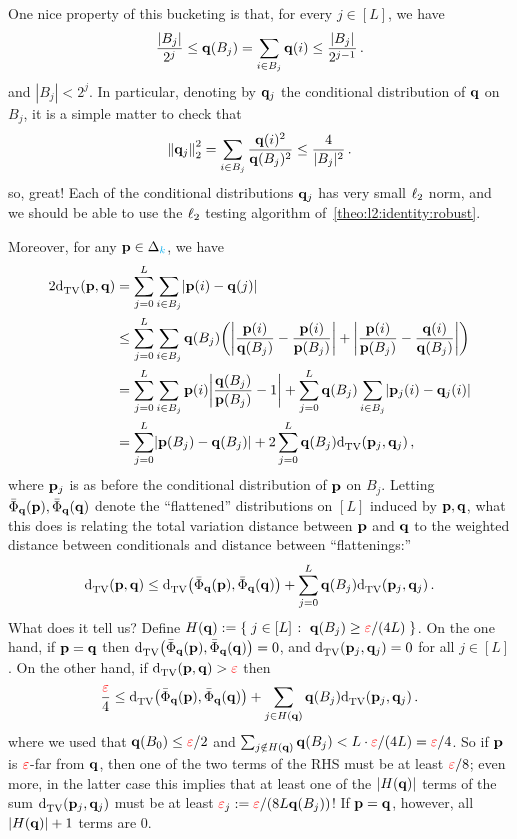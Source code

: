  One nice property of this bucketing is that, for every $j\in[L]$, we have
 \begin{equation}
 \label{eq:bucketing:bucketsize}
 	\frac{|B_j|}{2^{j}}  \leq \q(B_j) = \sum_{i\in B_j} \q(i) \leq \frac{|B_j|}{2^{j-1}}\,.
 \end{equation}
 and $|B_j| < 2^j$.
 In particular, denoting by $\q_j$ the conditional distribution of $\q$ on $B_j$, it is a simple matter to check that
\begin{equation}
 \label{eq:bucketing:l2norm}
 		\normtwo{\q_j}^2 = \sum_{i\in B_j} \frac{\q(i)^2}{\q(B_j)^2} \leq \frac{4}{|B_j|^2}\,.
\end{equation}
 so, great! Each of the conditional distributions $\q_j$ has very small $\lp[2]$ norm, and we should be able to use the $\lp[2]$ testing algorithm of~\cref{theo:l2:identity:robust}.
 
Moreover, for any $\p\in\distribs{\ab}$, we have
 \begin{align*}
 	2\totalvardist{\p}{\q} 
 	&= \sum_{j=0}^{L} \sum_{i\in B_j} \abs{\p(i)-\q(j)} \\
 	&\leq \sum_{j=0}^{L} \sum_{i\in B_j} \q(B_j)\Paren{ \abs{\frac{\p(i)}{\q(B_j)} - \frac{\p(i)}{\p(B_j)}}+\abs{\frac{\p(i)}{\p(B_j)} - \frac{\q(i)}{\q(B_j)}} }\\
 	&= \sum_{j=0}^{L} \sum_{i\in B_j} \p(i)\abs{\frac{\q(B_j)}{\p(B_j)} - 1}+\sum_{j=0}^{L} \q(B_j) \sum_{i\in B_j}\abs{\p_j(i)-\q_j(i)} \\
 	&= \sum_{j=0}^{L} \abs{\p(B_j) - \q(B_j)} + 2\sum_{j=0}^{L} \q(B_j) \totalvardist{\p_j}{\q_j} \,,
 \end{align*}
 where $\p_j$ is as before the conditional distribution of $\p$ on $B_j$. Letting $\bar{\Phi}_\q(\p),\bar{\Phi}_\q(\q)$ denote the ``flattened'' distributions on $[L]$ induced by $\p,\q$, what this does is relating the total variation distance between $\p$ and $\q$ to the weighted distance between conditionals and distance between ``flattenings:''
 \begin{equation}
 	\totalvardist{\p}{\q}  \leq \totalvardist{\bar{\Phi}_\q(\p)}{\bar{\Phi}_\q(\q)} +\sum_{j=0}^{L} \q(B_j) \totalvardist{\p_j}{\q_j}\,.
 \end{equation}
 What does it tell us? Define $H(\q) \eqdef \setOfSuchThat{j \in[L] }{ \q(B_j) \geq \dst/(4L)}$. On the one hand, if $\p=\q$ then $\totalvardist{\bar{\Phi}_\q(\p)}{\bar{\Phi}_\q(\q)}=0$, and $\totalvardist{\p_j}{\q_j}=0$ for all $j\in[L]$. On the other hand, if $\totalvardist{\p}{\q}>\dst$ then
 \begin{equation}
 	\frac{\dst}{4}  \leq \totalvardist{\bar{\Phi}_\q(\p)}{\bar{\Phi}_\q(\q)} +\sum_{j\in H(\q)}\q(B_j) \totalvardist{\p_j}{\q_j}\,.
 \end{equation}
 where we used that $\q(B_{0}) \leq \dst/2$ and $\sum_{j\notin H(\q)}\q(B_j) < L\cdot \dst/(4L) = \dst/4$. So if $\p$ is $\dst$-far from $\q$, then one of the two terms of the RHS must be at least $\dst/8$; even more, in the latter case this implies that at least one of the $|H(\q)|$ terms of the sum $\totalvardist{\p_j}{\q_j}$ must be at least $\dst_j \eqdef \dst/(8L\q(B_j))$! If $\p=\q$, however, all $|H(\q)|+1$ terms are $0$.
 
